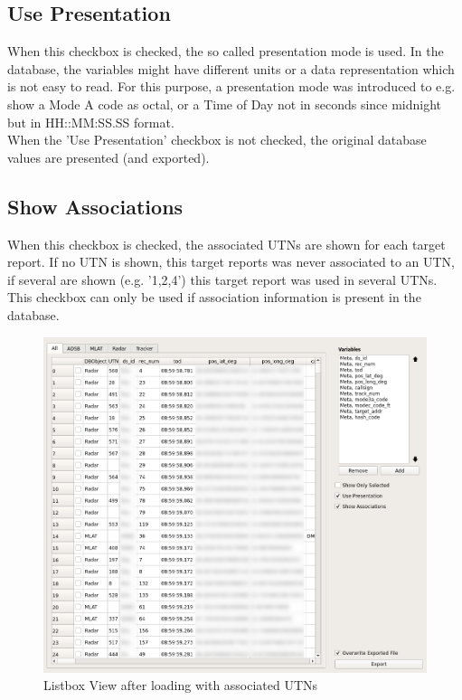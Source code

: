 \subsection{Use Presentation}
When this checkbox is checked, the so called presentation mode is used. In the database, the variables might have different units or a data representation which is not easy to read. For this purpose, a presentation mode was introduced to e.g. show a Mode A code as octal, or a Time of Day not in seconds since midnight but in HH::MM:SS.SS format. \\

When the 'Use Presentation' checkbox is not checked, the original database values are presented (and exported).

\subsection{Show Associations}
When this checkbox is checked, the associated UTNs are shown for each target report. If no UTN is shown, this target reports was never associated to an UTN, if several are shown (e.g. '1,2,4') this target report was used in several UTNs. \\

This checkbox can only be used if association information is present in the database.

\begin{figure}[H]
    \hspace*{-2cm}
    \includegraphics[width=18cm,frame]{../screenshots/listbox_loaded_assoc.png}
  \caption{Listbox View after loading with associated UTNs}
\end{figure}


